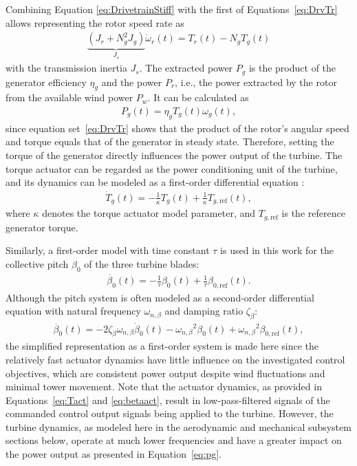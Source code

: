 Combining Equation \eqref{eq:DrivetrainStiff} with the first of Equations~\eqref{eq:DrvTr} allows representing the rotor speed rate as
\begin{align*}
    \underbrace{(J_r + N^2_g J_g)}_{J_s}\dot{\omega}_r(t)= T_r(t) - N_g T_g(t)
\end{align*}
with the transmission inertia $J_s$. The extracted power $P_{g}$ is the product of the generator efficiency $\eta_{g}$ and the power $P_r$, i.e., the power extracted by the rotor from the available wind power $P_w$. It can be calculated as 
\begin{align}\label{eq:pg}
    P_{g}(t) = \eta_{g} T_{g}(t) \omega_{g}(t),
\end{align}
since equation set~\eqref{eq:DrvTr} shows that the product of the rotor's angular speed and torque equals that of the generator in steady state. Therefore, setting the torque of the generator directly influences the power output of the turbine.
%
The torque actuator can be regarded as the power conditioning unit of the turbine, and its dynamics can be modeled as a first-order differential equation \cite{odgaard2013fault}:
\begin{align}\label{eq:Tact}
    \dot{T}_{g}(t) = -\frac{1}{\kappa} T_{g}(t) + \frac{1}{\kappa} T_{g,\text{ref}}(t), 
\end{align}
where $\kappa$ denotes the torque actuator model parameter, and $T_{g,\text{ref}}$ is the reference generator torque.

Similarly, a first-order model with time constant $\tau$ is used in this work for the collective pitch $\beta_0$ of the three turbine blades:
\begin{align}\label{eq:betaact}
    \dot{\beta_0}(t) = -\frac{1}{\tau}\beta_0(t) + \frac{1}{\tau}\beta_{0,\text{ref}}(t).
\end{align}
Although the pitch system is often modeled as a second-order differential equation with natural frequency $\omega_{n,\beta}$ and damping ratio $\zeta_{\beta}$:
\begin{align*}
    \ddot{\beta_0}(t) = -2\zeta_{\beta} \omega_{n,\beta} \dot{\beta}_0(t) - {\omega_{n,\beta}}^2 \beta_0(t) + {\omega_{n,\beta}}^2 \beta_{0,\text{ref}}(t),
\end{align*}
the simplified representation as a first-order system is made here since the relatively fast actuator dynamics have little influence on the investigated control objectives, which are consistent power output despite wind fluctuations and minimal tower movement. Note that the actuator dynamics, as provided in Equations~\eqref{eq:Tact} and \eqref{eq:betaact}, result in low-pass-filtered signals of the commanded control output signals being applied to the turbine. However, the turbine dynamics, as modeled here in the aerodynamic and mechanical subsystem sections below, operate at much lower frequencies and have a greater impact on the power output as presented in Equation~\eqref{eq:pg}.
